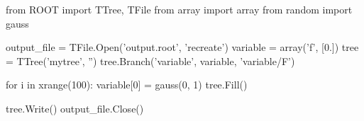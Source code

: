 \begin{footnotesize}
\begin{pyglist}[language=python,texcl=true,abovecaptionskip=0,style=vs,bgcolor=Moccasin]
from ROOT import TTree, TFile
from array import array
from random import gauss

output_file = TFile.Open('output.root', 'recreate')
variable = array('f', [0.])
tree = TTree('mytree', '')
tree.Branch('variable', variable, 'variable/F')

for i in xrange(100):
    variable[0] = gauss(0, 1)
    tree.Fill()

tree.Write()
output_file.Close()
\end{pyglist}
\end{footnotesize}
